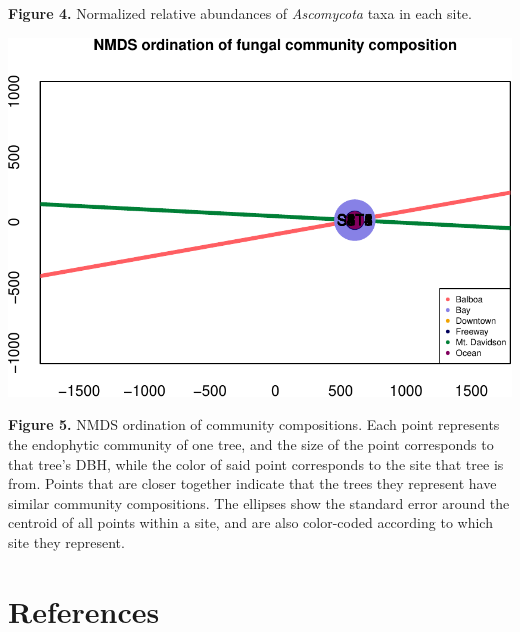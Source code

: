 \documentclass[fleqn,10pt,lineno]{wlpeerj} %
\begin{document}
\textbf{Figure 4.} Normalized relative abundances of \emph{Ascomycota}
taxa in each site.

\includegraphics{gibson2021_files/figure-latex/ordination-1.pdf}

\textbf{Figure 5.} NMDS ordination of community compositions. Each point
represents the endophytic community of one tree, and the size of the
point corresponds to that tree's DBH, while the color of said point
corresponds to the site that tree is from. Points that are closer
together indicate that the trees they represent have similar community
compositions. The ellipses show the standard error around the centroid
of all points within a site, and are also color-coded according to which
site they represent.

\hypertarget{references}{%
\section*{References}\label{references}}
\end{document}
